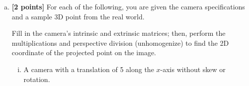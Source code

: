 \begin{enumerate}[(a)]
\item \textbf{[2 points]}
For each of the following, you are given the camera specifications and a sample 3D point from the real world. 

\begin{tcolorbox}[colback=orange!5!white,colframe=orange!75!black]
Fill in the camera's intrinsic and extrinsic matrices; then, perform the multiplications and perspective division (unhomogenize) to find the 2D coordinate of the projected point on the image.
\end{tcolorbox}

\begin{enumerate} [(i)]
\item A camera with a translation of 5 along the $x$-axis without skew or rotation.


\end{enumerate}
\end{enumerate}
